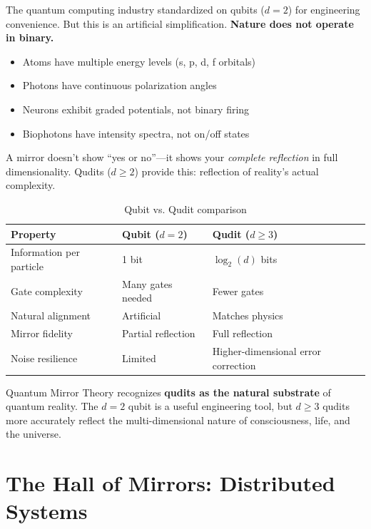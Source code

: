 \documentclass[12pt,a4paper]{article}
\begin{document}
The quantum computing industry standardized on qubits ($d=2$) for engineering convenience. But this is an artificial simplification. \textbf{Nature does not operate in binary.}

\begin{itemize}
    \item Atoms have multiple energy levels (s, p, d, f orbitals)
    \item Photons have continuous polarization angles
    \item Neurons exhibit graded potentials, not binary firing
    \item Biophotons have intensity spectra, not on/off states
\end{itemize}

A mirror doesn't show ``yes or no''---it shows your \textit{complete reflection} in full dimensionality. Qudits ($d \geq 2$) provide this: reflection of reality's actual complexity.

\begin{table}[h]
\centering
\begin{tabular}{lll}
\toprule
\textbf{Property} & \textbf{Qubit ($d=2$)} & \textbf{Qudit ($d \geq 3$)} \\
\midrule
Information per particle & 1 bit & $\log_2(d)$ bits \\
Gate complexity & Many gates needed & Fewer gates \\
Natural alignment & Artificial & Matches physics \\
Mirror fidelity & Partial reflection & Full reflection \\
Noise resilience & Limited & Higher-dimensional error correction \\
\bottomrule
\end{tabular}
\caption{Qubit vs. Qudit comparison}
\end{table}

Quantum Mirror Theory recognizes \textbf{qudits as the natural substrate} of quantum reality. The $d=2$ qubit is a useful engineering tool, but $d \geq 3$ qudits more accurately reflect the multi-dimensional nature of consciousness, life, and the universe.

\section{The Hall of Mirrors: Distributed Systems}
\end{document}
